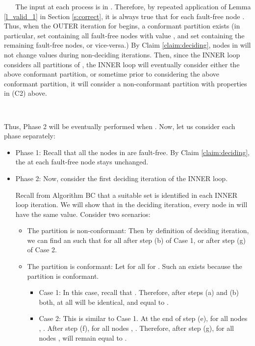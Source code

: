 \documentclass[letterpaper, 11pt]{article}
\newenvironment{proof}{\noindent {\bf Proof:}~}{\hspace*{\fill}}
\begin{document}
\begin{proof}
\begin{proof}
The input at each process is in . Therefore,
by repeated application of Lemma \ref{l_valid_1} in Section \ref{s:correct}, it is always true that  for each fault-free node . Thus, when the OUTER iteration for  begins, a conformant partition exists (in particular, set  containing all fault-free nodes with  value , and set  containing the remaining fault-free nodes, or vice-versa.) By Claim \ref{claim:deciding}, nodes in  will not change values during non-deciding iterations.
Then, since the INNER loop considers all partitions of , the INNER loop will eventually consider
either the above conformant partition, or sometime prior to considering the above conformant
partition, it will consider a non-conformant partition with properties in (C2) above.
\end{proof}

~

Thus, Phase 2 will be eventually performed when . Now, let us consider each phase separately:
\begin{itemize}

\item Phase 1: Recall that all the nodes in  are fault-free. By Claim \ref{claim:deciding}, the  at each fault-free node  stays unchanged.

\item Phase 2: Now, consider the first deciding iteration of the INNER loop. 

Recall from Algorithm BC that a suitable set  is identified in each INNER loop iteration.
 We will show that in the deciding iteration, every node in  will have the same  value. Consider two scenarios:

\begin{itemize}
\item The partition is non-conformant: Then by definition of deciding iteration, we can find an  such that  for all  after step (b) of Case 1, or after step (g) of Case 2.

\item The partition is conformant: Let  for all  for . Such an  exists because the partition is conformant.

\begin{itemize}
\item Case 1: In this case, recall that . Therefore, after steps (a) and (b) both,  at all  will be identical, and equal to .

\item Case 2: This is similar to Case 1. At the end of step (e), for all nodes
, .
After step (f), for all nodes , .
Therefore, after step (g),  for all nodes ,  will remain equal to .
\end{itemize}


\end{itemize}
\end{itemize}
\end{proof}
\end{document}
